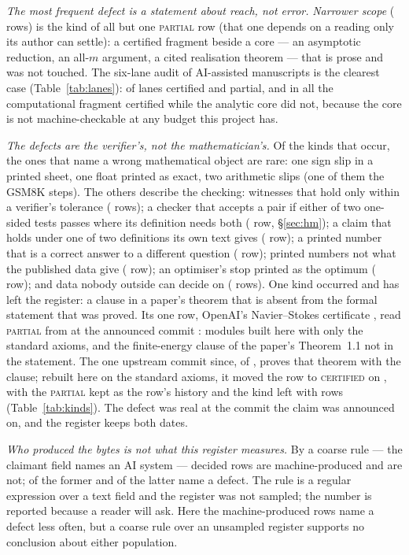 \documentclass[11pt]{article}
\theoremstyle{plain}
\theoremstyle{definition}
\begin{document}
\emph{The most frequent defect is a statement about reach, not error.} \emph{Narrower scope} (\KNarrower{} rows) is the kind of all but one \textsc{partial} row (that one depends on a reading only its author can settle): a certified fragment beside a core --- an asymptotic reduction, an all-$m$ argument, a cited realisation theorem --- that is prose and was not touched. The six-lane audit of AI-assisted manuscripts is the clearest case (Table~\ref{tab:lanes}): \AiConfirmed{} of \AiLanes{} lanes certified and \AiPartial{} partial, and in all \AiLanes{} the computational fragment certified while the analytic core did not, because the core is not machine-checkable at any budget this project has.

\emph{The defects are the verifier's, not the mathematician's.} Of the \RegKindsUsed{} kinds that occur, the ones that name a wrong mathematical object are rare: one sign slip in a printed sheet, one float printed as exact, two arithmetic slips (one of them the \GsWrong{} GSM8K steps). The others describe the checking: witnesses that hold only within a verifier's tolerance (\KTolerance{} rows); a checker that accepts a pair if either of two one-sided tests passes where its definition needs both (\KChecker{} row, \S\ref{sec:hm}); a claim that holds under one of two definitions its own text gives (\KReading{} row); a printed number that is a correct answer to a different question (\KWrongQuantity{} row); printed numbers not what the published data give (\KNotFromData{} row); an optimiser's stop printed as the optimum (\KNotOptimum{} row); and data nobody outside can decide on (\KDataNotPublic{} rows). One kind occurred and has left the register: a clause in a paper's theorem that is absent from the formal statement that was proved. Its one row, OpenAI's Navier--Stokes certificate \cite{OpenAINS}, read \textsc{partial} from \NsPriorRecorded{} at the announced commit \NsCommit{}: \NsJobs{} modules built here with only the standard axioms, and the finite-energy clause of the paper's Theorem~1.1 not in the statement. The one upstream commit since, \NsHeadCommit{} of \NsHeadDate, proves that theorem with the clause; rebuilt here on the standard axioms, it moved the row to \textsc{certified} on \NsRecorded, with the \textsc{partial} kept as the row's history and the kind left with \KClause{} rows (Table~\ref{tab:kinds}). The defect was real at the commit the claim was announced on, and the register keeps both dates.

\emph{Who produced the bytes is not what this register measures.} By a coarse rule --- the claimant field names an AI system --- \AiRows{} decided rows are machine-produced and \OtherRows{} are not; \AiRowsDefects{} of the former and \OtherRowsDefects{} of the latter name a defect. The rule is a regular expression over a text field and the register was not sampled; the number is reported because a reader will ask. Here the machine-produced rows name a defect less often, but a coarse rule over an unsampled register supports no conclusion about either population.
\end{document}
